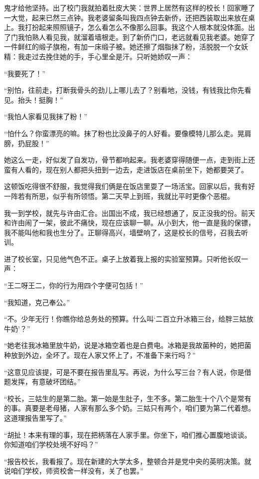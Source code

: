  鬼才给他坚持。出了校门我就拍着肚皮大笑：世界上居然有这样的校长！回家睡了一大觉，起来已然三点钟。我老婆留条叫我四点钟去新侨，还把西装取出来放在桌上。我打扮起来照照镜子，怎么看怎么不像那么回事。我这个人根本就没体面。出了门我怕熟人看见我，就溜着墙根走。到了新侨门口，老远就看见我老婆。她穿了一件鲜红的缎子旗袍，有加一床缎子被。她还擦了烟脂抹了粉，活脱脱一个女妖精：我走过去挽住她的手，手心里全是汗。只听她娇叹一声： 
 
 “我要死了！” 
 
 “别怕，往前走，打断我骨头的劲儿上哪儿去了？别看地，没钱，有钱我比你先看见。抬头！挺胸！” 
 
 “我怕人家看见我抹了粉！” 
 
 “怕什么？你蛮漂亮的嘛。抹了粉也比没鼻子的人好看。要像模特儿那么走。晃肩膀，扔屁股！” 
 
 她这么一走，好似发了自发功，骨节都响起来。我老婆穿得随便一点，走到街上还蛮有人看的，现在别人都把头扭到一边去，走进饭店在桌前坐下，她都要哭了。 
 
 这顿饭吃得很不舒服，我觉得我们俩是在饭店里耍了一场活宝。回家以后，我有好一阵若有所思，似乎有所领悟。第二天早上到班，我就比平时更像个恶棍。 
 
 我一到学校，就先与许由汇合。出国出不成，我已经想通了，反正没我的份。前天和许由闹了一架，彼此不痛快，现在应该聊一聊。从小到大，他一直是我的保镖，我不能叫他和我也生分了。正聊得高兴，墙壁响了，这是校长的信号，召我去听训。 
 
 进了校长室，只见他气色不正。桌子上放着我上报的实验室预算。只听他长叹一声： 
 
 “王二呀王二，你的行为用四个字便可包括！” 
 
 “我知道，克己奉公。” 
 
 “不。少年无行！你瞧你给总务处的预算。什么叫‘二百立升冰箱三台，给胖三姑放牛奶’？” 
 
 “她老往我冰箱里放牛奶，说是冰箱空着也是白费电。冰箱是我故菌种的，她把菌种放到外边，全坏了。现在人家又怀上了，不准备下来行吗？” 
 
 “这意见应该提，可是不要在报告里乱写。再说，为什么写三台？有人说，你是借题发挥，有意破坏团结。” 
 
 “校长，三姑生的是第二胎。第一始是生肚子，生不多。第二胎生十个八个是常有的事。真要是老母猪，人家有那么多个奶。三姑只有两个，咱们要为第二代着想。这道理报告里写了。” 
 
 “胡扯！本来有理的事，现在把柄落在人家手里。你坐下，咱们推心置腹地谈谈。你知道咱们学校处境不好吗？” 
 
 “报告校长，我看报了。现在新建的大学太多，整顿合并是党中央的英明决策。就说咱们学校，师资校舍一样没有，关了也罢。” 
 
